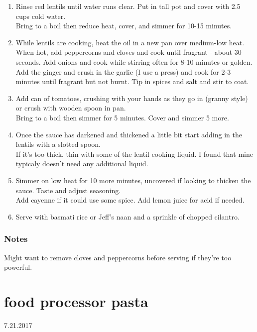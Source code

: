 \documentclass[]{book}
\providecommand{\tightlist}{%
  \setlength{\itemsep}{0pt}\setlength{\parskip}{0pt}}
\begin{document}
\begin{enumerate}
\def\labelenumi{\arabic{enumi}.}
\tightlist
\item
  Rinse red lentils until water runs clear. Put in tall pot and cover with 2.5 cups cold water.\\
  Bring to a boil then reduce heat, cover, and simmer for 10-15 minutes.
\item
  While lentils are cooking, heat the oil in a new pan over medium-low heat. When hot, add peppercorns and
  cloves and cook until fragrant - about 30 seconds. Add onions and cook while stirring often for 8-10 minutes
  or golden. Add the ginger and crush in the garlic (I use a press) and cook for 2-3 minutes until fragrant but
  not burnt. Tip in spices and salt and stir to coat.
\item
  Add can of tomatoes, crushing with your hands as they go in (granny style) or crush with wooden spoon in pan.\\
  Bring to a boil then simmer for 5 minutes. Cover and simmer 5 more.
\item
  Once the sauce has darkened and thickened a little bit start adding in the lentils with a slotted spoon.\\
  If it's too thick, thin with some of the lentil cooking liquid. I found that mine typicaly doesn't need any
  additional liquid.
\item
  Simmer on low heat for 10 more minutes, uncovered if looking to thicken the sauce. Taste and adjust seasoning.\\
  Add cayenne if it could use some spice. Add lemon juice for acid if needed.
\item
  Serve with basmati rice or Jeff's naan and a sprinkle of chopped cilantro.
\end{enumerate}

\hypertarget{notes-24}{%
\subsection{Notes}\label{notes-24}}

Might want to remove cloves and peppercorns before serving if they're too powerful.

\hypertarget{food-processor-pasta}{%
\chapter{food processor pasta}\label{food-processor-pasta}}

7.21.2017
\end{document}
